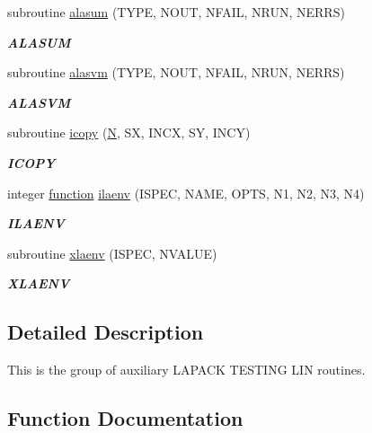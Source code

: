 \begin{DoxyCompactItemize}
subroutine \hyperlink{group__aux__lin_gad56ccbe8939c1230b917e03bf7b722b7}{alasum} (T\+Y\+P\+E, N\+O\+U\+T, N\+F\+A\+I\+L, N\+R\+U\+N, N\+E\+R\+R\+S)
\begin{DoxyCompactList}\small\item\em {\bfseries A\+L\+A\+S\+U\+M} \end{DoxyCompactList}\item 
subroutine \hyperlink{group__aux__lin_gad0cdc70e35bb8b07b0e95688e8d2123f}{alasvm} (T\+Y\+P\+E, N\+O\+U\+T, N\+F\+A\+I\+L, N\+R\+U\+N, N\+E\+R\+R\+S)
\begin{DoxyCompactList}\small\item\em {\bfseries A\+L\+A\+S\+V\+M} \end{DoxyCompactList}\item 
subroutine \hyperlink{group__aux__lin_ga977a7a5ad5efccf234a1ac5b23dd18cd}{icopy} (\hyperlink{polmisc_8c_a0240ac851181b84ac374872dc5434ee4}{N}, S\+X, I\+N\+C\+X, S\+Y, I\+N\+C\+Y)
\begin{DoxyCompactList}\small\item\em {\bfseries I\+C\+O\+P\+Y} \end{DoxyCompactList}\item 
integer \hyperlink{afunc_8m_a7b5e596df91eadea6c537c0825e894a7}{function} \hyperlink{group__aux__lin_gab1f37bde76d31aee91a09bb2f8e87ce6}{ilaenv} (I\+S\+P\+E\+C, N\+A\+M\+E, O\+P\+T\+S, N1, N2, N3, N4)
\begin{DoxyCompactList}\small\item\em {\bfseries I\+L\+A\+E\+N\+V} \end{DoxyCompactList}\item 
subroutine \hyperlink{group__aux__lin_gae6f1eead77499e53bd640389a95288c4}{xlaenv} (I\+S\+P\+E\+C, N\+V\+A\+L\+U\+E)
\begin{DoxyCompactList}\small\item\em {\bfseries X\+L\+A\+E\+N\+V} \end{DoxyCompactList}\end{DoxyCompactItemize}


\subsection{Detailed Description}
This is the group of auxiliary L\+A\+P\+A\+C\+K T\+E\+S\+T\+I\+N\+G L\+I\+N routines. 

\subsection{Function Documentation}
\hypertarget{group__aux__lin_ga43c917c7aed0f5b199f88702afcb4801}{}
